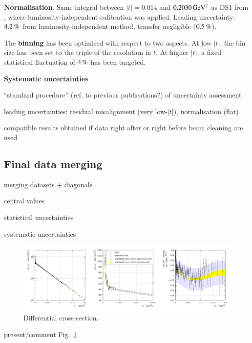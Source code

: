 {\bf Normalisation}. Same integral between $|t| = 0.014$ and $0.2030\,{\rm GeV^2}$ as DS1 from \cite{prl111}, where luminosity-independent calibration was applied. Leading uncertainty: $4.2\,{\rm \%}$ from luminosity-independent method, transfer negligible ($0.5\,{\rm \%}$).



The {\bf binning} has been optimised with respect to two aspects. At low $|t|$, the bin size has been set to the triple of the resolution in $t$. At higher $|t|$, a fixed statistical fluctuation of $4\,{\rm \%}$ has been targeted.

{\bf Systematic uncertainties}

\> ``standard procedure'' (ref. to previous publications?) of uncertainty assessment

\> leading uncertainties: residual misalignment (very low-$|t|$), normalisation (flat)

\> compatible results obtained if data right after or right before beam cleaning are used



\subsection{Final data merging}

\> merging datasets + diagonals

\> central values

\> statistical uncertainties

\> systematic uncertainties





\begin{figure}
\vskip-5mm
\begin{center}
\includegraphics[width=18cm]{fig/t_dist_tabulation.pdf}
\vskip-3mm
\caption{Differential cross-section.  }
\label{fig:dsdt}
\end{center}
\end{figure}

\> present/comment Fig.~\ref{fig:dsdt}


